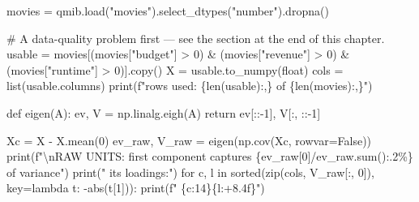 \documentclass[
  letterpaper,
  10pt,
  twoside,
  openright,
  numbers=noenddot,
  chapterprefix=true]{scrbook}
\newenvironment{Shaded}{}{}
\newcommand{\BuiltInTok}[1]{\textcolor[rgb]{0.84,0.23,0.29}{#1}}
\newcommand{\CharTok}[1]{\textcolor[rgb]{0.01,0.18,0.38}{#1}}
\newcommand{\CommentTok}[1]{\textcolor[rgb]{0.42,0.45,0.49}{#1}}
\newcommand{\ControlFlowTok}[1]{\textcolor[rgb]{0.84,0.23,0.29}{#1}}
\newcommand{\DecValTok}[1]{\textcolor[rgb]{0.00,0.36,0.77}{#1}}
\newcommand{\KeywordTok}[1]{\textcolor[rgb]{0.84,0.23,0.29}{#1}}
\newcommand{\NormalTok}[1]{\textcolor[rgb]{0.14,0.16,0.18}{#1}}
\newcommand{\OperatorTok}[1]{\textcolor[rgb]{0.14,0.16,0.18}{#1}}
\newcommand{\SpecialCharTok}[1]{\textcolor[rgb]{0.00,0.36,0.77}{#1}}
\newcommand{\SpecialStringTok}[1]{\textcolor[rgb]{0.01,0.18,0.38}{#1}}
\newcommand{\StringTok}[1]{\textcolor[rgb]{0.01,0.18,0.38}{#1}}
\newcommand{\VariableTok}[1]{\textcolor[rgb]{0.89,0.38,0.04}{#1}}
\begin{document}
\label{check-standardise}
\begin{Shaded}
\begin{Highlighting}[]
\NormalTok{movies }\OperatorTok{=}\NormalTok{ qmib.load(}\StringTok{"movies"}\NormalTok{).select\_dtypes(}\StringTok{"number"}\NormalTok{).dropna()}

\CommentTok{\# A data{-}quality problem first — see the section at the end of this chapter.}
\NormalTok{usable }\OperatorTok{=}\NormalTok{ movies[(movies[}\StringTok{"budget"}\NormalTok{] }\OperatorTok{\textgreater{}} \DecValTok{0}\NormalTok{) }\OperatorTok{\&}\NormalTok{ (movies[}\StringTok{"revenue"}\NormalTok{] }\OperatorTok{\textgreater{}} \DecValTok{0}\NormalTok{)}
                \OperatorTok{\&}\NormalTok{ (movies[}\StringTok{"runtime"}\NormalTok{] }\OperatorTok{\textgreater{}} \DecValTok{0}\NormalTok{)].copy()}
\NormalTok{X }\OperatorTok{=}\NormalTok{ usable.to\_numpy(}\BuiltInTok{float}\NormalTok{)}
\NormalTok{cols }\OperatorTok{=} \BuiltInTok{list}\NormalTok{(usable.columns)}
\BuiltInTok{print}\NormalTok{(}\SpecialStringTok{f"rows used: }\SpecialCharTok{\{}\BuiltInTok{len}\NormalTok{(usable)}\SpecialCharTok{:,\}}\SpecialStringTok{ of }\SpecialCharTok{\{}\BuiltInTok{len}\NormalTok{(movies)}\SpecialCharTok{:,\}}\SpecialStringTok{"}\NormalTok{)}

\KeywordTok{def}\NormalTok{ eigen(A):}
\NormalTok{    ev, V }\OperatorTok{=}\NormalTok{ np.linalg.eigh(A)}
    \ControlFlowTok{return}\NormalTok{ ev[::}\OperatorTok{{-}}\DecValTok{1}\NormalTok{], V[:, ::}\OperatorTok{{-}}\DecValTok{1}\NormalTok{]}

\NormalTok{Xc }\OperatorTok{=}\NormalTok{ X }\OperatorTok{{-}}\NormalTok{ X.mean(}\DecValTok{0}\NormalTok{)}
\NormalTok{ev\_raw, V\_raw }\OperatorTok{=}\NormalTok{ eigen(np.cov(Xc, rowvar}\OperatorTok{=}\VariableTok{False}\NormalTok{))}
\BuiltInTok{print}\NormalTok{(}\SpecialStringTok{f"}\CharTok{\textbackslash{}n}\SpecialStringTok{RAW UNITS: first component captures }\SpecialCharTok{\{}\NormalTok{ev\_raw[}\DecValTok{0}\NormalTok{]}\OperatorTok{/}\NormalTok{ev\_raw}\SpecialCharTok{.}\BuiltInTok{sum}\NormalTok{()}\SpecialCharTok{:.2\%\}}\SpecialStringTok{ of variance"}\NormalTok{)}
\BuiltInTok{print}\NormalTok{(}\StringTok{"  its loadings:"}\NormalTok{)}
\ControlFlowTok{for}\NormalTok{ c, l }\KeywordTok{in} \BuiltInTok{sorted}\NormalTok{(}\BuiltInTok{zip}\NormalTok{(cols, V\_raw[:, }\DecValTok{0}\NormalTok{]), key}\OperatorTok{=}\KeywordTok{lambda}\NormalTok{ t: }\OperatorTok{{-}}\BuiltInTok{abs}\NormalTok{(t[}\DecValTok{1}\NormalTok{])):}
    \BuiltInTok{print}\NormalTok{(}\SpecialStringTok{f"    }\SpecialCharTok{\{}\NormalTok{c}\SpecialCharTok{:14\}\{}\NormalTok{l}\SpecialCharTok{:+8.4f\}}\SpecialStringTok{"}\NormalTok{)}


\end{Highlighting}
\end{Shaded}
\end{document}
